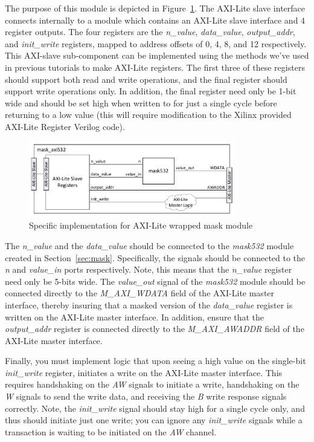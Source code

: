 \documentclass{article}
\begin{document}
The purpose of this module is depicted in Figure~\ref{fig:mask_ip}. The AXI-Lite slave interface connects internally to a module which contains an AXI-Lite slave interface and 4 register outputs. The four registers are the \textit{n\_value}, \textit{data\_value}, \textit{output\_addr}, and \textit{init\_write} registers, mapped to address offsets of 0, 4, 8, and 12 respectively. This AXI-slave sub-component can be implemented using the methods we've used in previous tutorials to make AXI-Lite registers. The first three of these registers should support both read and write operations, and the final register should support write operations only. In addition, the final register need only be 1-bit wide and should be set high when written to for just a single cycle before returning to a low value (this will require modification to the Xilinx provided AXI-Lite Register Verilog code).

\begin{figure}[t]
\centering
\includegraphics[width=0.8\textwidth]{mask_axi.pdf}
\caption{Specific implementation for AXI-Lite wrapped mask module}
\label{fig:mask_ip}
\end{figure}

The \textit{n\_value} and the \textit{data\_value} should be connected to the \textit{mask532} module created in Section~\ref{sec:mask}. Specifically, the signals should be connected to the \textit{n} and \textit{value\_in} ports respectively. Note, this means that the \textit{n\_value} register need only be 5-bits wide. The \textit{value\_out} signal of the \textit{mask532} module should be connected directly to the \textit{M\_AXI\_WDATA} field of the AXI-Lite master interface, thereby insuring that a masked version of the \textit{data\_value} register is written on the AXI-Lite master interface. In addition, ensure that the \textit{output\_addr} register is connected directly to the \textit{M\_AXI\_AWADDR} field of the AXI-Lite master interface.

Finally, you must implement logic that upon seeing a high value on the single-bit \textit{init\_write} register, initiates a write on the AXI-Lite master interface. This requires handshaking on the \textit{AW} signals to initiate a write, handshaking on the \textit{W} signals to send the write data, and receiving the \textit{B} write response signals correctly. Note, the \textit{init\_write} signal should stay high for a single cycle only, and thus should initiate just one write; you can ignore any \textit{init\_write} signals while a transaction is waiting to be initiated on the \textit{AW} channel.
\end{document}
